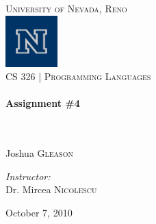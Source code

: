 \begin{titlepage}
\begin{center}

\textsc{\LARGE University of Nevada, Reno}\\[.5cm]
\includegraphics[width=0.15\textwidth]{./logo.png}\\[.5cm]

\textsc{\large CS 326 | Programming Languages } \\[.5cm]

\HRule \\[0.4cm]
{ \huge \bfseries Assignment \#4}\\[0.4cm]

\HRule \\[1.5cm]

\begin{minipage}{0.4\textwidth}
\begin{flushleft} \large
\emph{}\\
    Joshua \textsc{Gleason}\\
    \end{flushleft}
    \end{minipage}
    \begin{minipage}{0.4\textwidth}
    \begin{flushright} \large
    \emph{Instructor:} \\
      Dr. Mircea \textsc{Nicolescu}
      \end{flushright}
      \end{minipage}

      \vspace*{\fill}

{\large October 7, 2010}

\end{center}

\end{titlepage}


